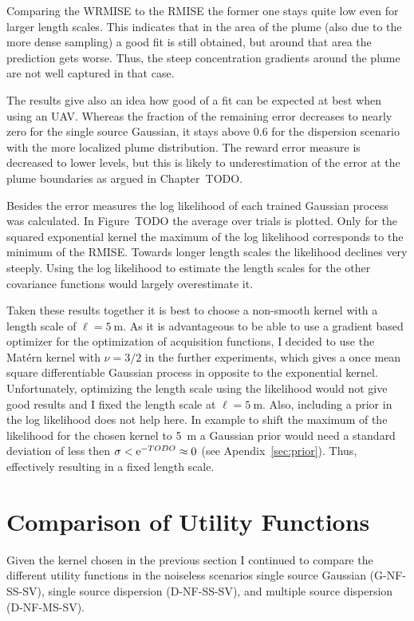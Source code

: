 Comparing the WRMISE to the RMISE the former one stays quite low even for larger 
length scales. This indicates that in the area of the plume (also due to the more 
dense sampling) a good fit is still obtained, but around that area the 
prediction gets worse. Thus, the steep concentration gradients around the plume 
are not well captured in that case.

The results give also an idea how good of a fit can be expected at best when 
using an UAV\@. Whereas the fraction of the remaining error decreases to nearly 
zero for the single source Gaussian, it stays above 0.6 for the dispersion 
scenario with the more localized plume distribution. The reward error measure is 
decreased to lower levels, but this is likely to underestimation of the error at 
the plume boundaries as argued in Chapter~TODO\@.

Besides the error measures the log likelihood of each trained Gaussian process 
was calculated. In Figure~TODO the average over trials is plotted. Only for the 
squared exponential kernel the maximum of the log likelihood corresponds to the 
minimum of the RMISE\@. Towards longer length scales the likelihood declines very 
steeply. Using the log likelihood to estimate the length scales for the other 
covariance functions would largely overestimate it.

Taken these results together it is best to choose a non-smooth kernel with 
a length scale of $\ell = \SI{5}{\meter}$. As it is advantageous to be able to 
use a gradient based optimizer for the optimization of acquisition functions, 
I decided to use the Matérn kernel with $\nu = 3/2$ in the further experiments, 
which gives a once mean square differentiable Gaussian process in opposite to 
the exponential kernel. Unfortunately, optimizing the length scale using the 
likelihood would not give good results and I fixed the length scale at $\ell 
= \SI{5}{\meter}$. Also, including a prior in the log likelihood does not help 
here. In example to shift the maximum of the likelihood for the chosen kernel to 
\SI{5}{\meter} a Gaussian prior would need a standard deviation of less then 
$\sigma < \mathrm{e}^{-TODO} \approx 0$ (see Apendix~\ref{sec:prior}). Thus, effectively 
resulting in a fixed length scale.

\section{Comparison of Utility Functions}\label{sec:cmputility}
Given the kernel chosen in the previous section I continued to compare the 
different utility functions in the noiseless scenarios single source Gaussian 
(G-NF-SS-SV), single source dispersion (D-NF-SS-SV), and multiple source 
dispersion (D-NF-MS-SV).

